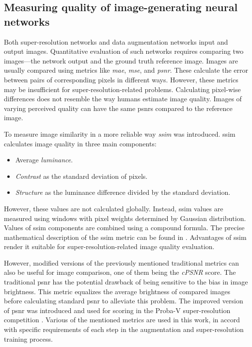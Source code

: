 \subsection{Measuring quality of image-generating neural networks}

Both super-resolution networks and data augmentation networks input and output images.
Quantitative evaluation of such networks requires comparing two images---the network output and the ground truth reference image.
Images are usually compared using metrics like \textit{\gls{mae}}, \textit{\gls{mse}}, and \textit{\gls{psnr}}.
These calculate the error between pairs of corresponding pixels in different ways.
However, these metrics may be insufficient for super-resolution-related problems.
Calculating pixel-wise differences does not resemble the way humans estimate image quality.
Images of varying perceived quality can have the same \gls{psnr}s compared to the reference image.

To measure image similarity in a more reliable way \textit{\gls{ssim}} \cite{wang-2004-ssim} was introduced.
\gls{ssim} calculates image quality in three main components:
\begin{itemize}
	\item Average \textit{luminance}.
	\item \textit{Contrast} as the standard deviation of pixels.
	\item \textit{Structure} as the luminance difference divided by the standard deviation.
\end{itemize}
However, these values are not calculated globally.
Instead, \gls{ssim} values are measured using windows with pixel weights determined by Gaussian distribution.
Values of \gls{ssim} components are combined using a compound formula.
The precise mathematical description of the \gls{ssim} metric can be found in \cite{wang-2004-ssim}.
Advantages of \gls{ssim} render it suitable for super-resolution-related image quality evaluation.

However, modified versions of the previously mentioned traditional metrics can also be useful for image comparison, one of them being the \textit{cPSNR} score.
The traditional \gls{psnr} has the potential drawback of being sensitive to the bias in image brightness.
This metric equalizes the average brightness of compared images before calculating standard \gls{psnr} to alleviate this problem.
The improved version of \gls{psnr} was introduced and used for scoring in the Proba-V super-resolution competition \cite{esa-proba-competition}.
Various of the mentioned metrics are used in this work, in accord with specific requirements of each step in the augmentation and super-resolution training process.

